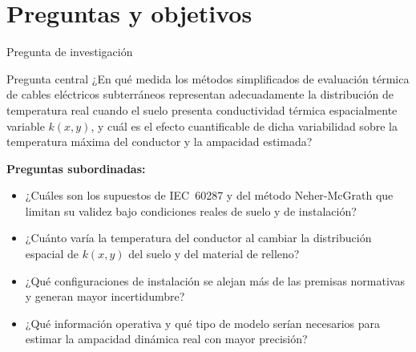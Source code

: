 \documentclass[aspectratio=169]{beamer}
\begin{document}
\section{Preguntas y objetivos}

\begin{frame}{Pregunta de investigación}

\begin{block}{Pregunta central}
\justifying
¿En qué medida los métodos simplificados de evaluación térmica de cables
eléctricos subterráneos representan adecuadamente la distribución de
temperatura real cuando el suelo presenta conductividad térmica
espacialmente variable $k(x,y)$, y cuál es el efecto cuantificable
de dicha variabilidad sobre la temperatura máxima del conductor y la
ampacidad estimada?
\end{block}

\vspace{0.7em}
\textbf{Preguntas subordinadas:}
\begin{itemize}[leftmargin=*]\small
    \item ¿Cuáles son los supuestos de IEC~60287 y del método
          Neher-McGrath que limitan su validez bajo condiciones reales
          de suelo y de instalación?
    \item ¿Cuánto varía la temperatura del conductor al cambiar la
          distribución espacial de $k(x,y)$ del suelo y del material
          de relleno?
    \item ¿Qué configuraciones de instalación se alejan más de las
          premisas normativas y generan mayor incertidumbre?
    \item ¿Qué información operativa y qué tipo de modelo serían
          necesarios para estimar la ampacidad dinámica real con mayor
          precisión?
\end{itemize}
\end{frame}
\end{document}
